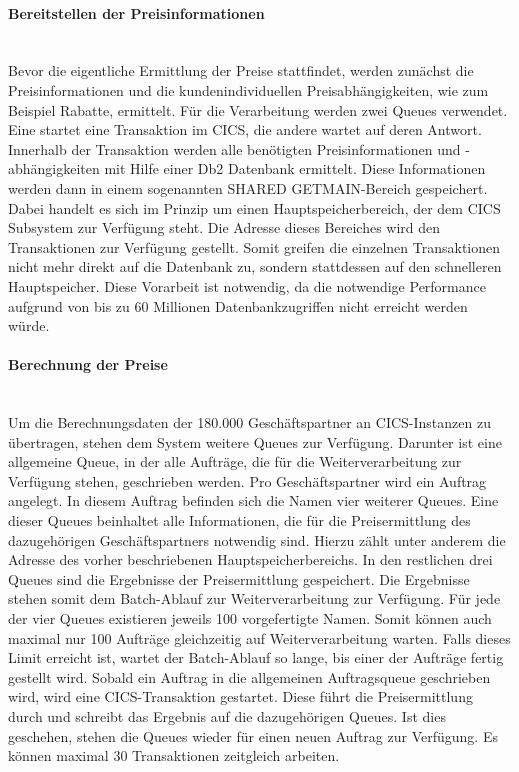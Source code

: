 \paragraph{Bereitstellen der Preisinformationen}~\\
Bevor die eigentliche Ermittlung der Preise stattfindet, werden zunächst die Preisinformationen und die kundenindividuellen Preisabhängigkeiten, wie zum Beispiel Rabatte, ermittelt.
Für die Verarbeitung werden zwei Queues verwendet.
Eine startet eine Transaktion im CICS, die andere wartet auf deren Antwort.
Innerhalb der Transaktion werden alle benötigten Preisinformationen und -abhängigkeiten mit Hilfe einer Db2 Datenbank ermittelt.
Diese Informationen werden dann in einem sogenannten \glqq SHARED GETMAIN\grqq-Bereich gespeichert.
Dabei handelt es sich im Prinzip um einen Hauptspeicherbereich, der dem CICS Subsystem zur Verfügung steht.
Die Adresse dieses Bereiches wird den Transaktionen zur Verfügung gestellt.
Somit greifen die einzelnen Transaktionen nicht mehr direkt auf die Datenbank zu, sondern stattdessen auf den schnelleren Hauptspeicher.
Diese Vorarbeit ist notwendig, da die notwendige Performance aufgrund von bis zu 60 Millionen Datenbankzugriffen nicht erreicht werden würde.

\paragraph{Berechnung der Preise}~\\
Um die Berechnungsdaten der 180.000 Geschäftspartner an CICS-Instanzen zu übertragen, stehen dem System weitere Queues zur Verfügung.
Darunter ist eine allgemeine Queue, in der alle Aufträge, die für die Weiterverarbeitung zur Verfügung stehen, geschrieben werden.
Pro Geschäftspartner wird ein Auftrag angelegt.
In diesem Auftrag befinden sich die Namen vier weiterer Queues.
Eine dieser Queues beinhaltet alle Informationen, die für die Preisermittlung des dazugehörigen Geschäftspartners notwendig sind.
Hierzu zählt unter anderem die Adresse des vorher beschriebenen Hauptspeicherbereichs.
In den restlichen drei Queues sind die Ergebnisse der Preisermittlung gespeichert.
Die Ergebnisse stehen somit dem Batch-Ablauf zur Weiterverarbeitung zur Verfügung.
Für jede der vier Queues existieren jeweils 100 vorgefertigte Namen.
Somit können auch maximal nur 100 Aufträge gleichzeitig auf Weiterverarbeitung warten.
Falls dieses Limit erreicht ist, wartet der Batch-Ablauf so lange, bis einer der Aufträge fertig gestellt wird.
Sobald ein Auftrag in die allgemeinen Auftragsqueue geschrieben wird, wird eine CICS-Transaktion gestartet.
Diese führt die Preisermittlung durch und schreibt das Ergebnis auf die dazugehörigen Queues.
Ist dies geschehen, stehen die Queues wieder für einen neuen Auftrag zur Verfügung.
Es können maximal 30 Transaktionen zeitgleich arbeiten.
